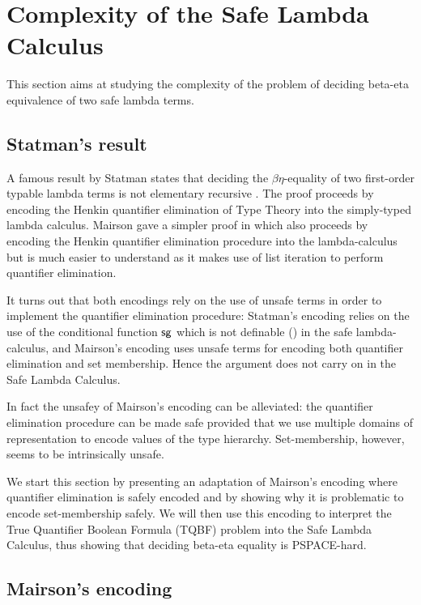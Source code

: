 \newcommand\bigo{\mathcal{O}} %
\newcommand\booltype{\mathsf{B}}

\section{Complexity of the Safe Lambda Calculus}
This section aims at studying the complexity of the problem of deciding beta-eta equivalence of two safe lambda terms.

\subsection{Statman's result}

A famous result by Statman  states that deciding the $\beta\eta$-equality of two first-order typable lambda terms is not elementary recursive \cite{Statman:1979:TLE}.
The proof proceeds by encoding the Henkin quantifier elimination of Type Theory into the simply-typed lambda calculus.
Mairson gave a simpler proof in \cite{mairson1992spt} which also proceeds by encoding the Henkin quantifier elimination procedure into the lambda-calculus but is much easier to understand as it makes use of list iteration to perform quantifier elimination.

It turns out that both encodings rely on the use of unsafe terms in order to implement the quantifier elimination procedure: Statman's encoding relies on the use of the conditional
function $\sf sg$ which is not definable (\cite{blumong:safelambdacalculus}) in the safe lambda-calculus, and Mairson's encoding uses unsafe terms for encoding both quantifier elimination and set membership. Hence the argument does not carry on in the Safe Lambda Calculus.

In fact the unsafey of Mairson's encoding can be alleviated: the quantifier elimination procedure can be made safe provided that we use multiple domains of representation to encode values of the type hierarchy. Set-membership, however, seems to be intrinsically unsafe.

We start this section by presenting an adaptation of Mairson's encoding where quantifier elimination is safely encoded and by showing why it is problematic to encode set-membership safely. We will then use this encoding to interpret the True Quantifier Boolean Formula (TQBF) problem into the Safe Lambda Calculus, thus showing that deciding beta-eta equality is PSPACE-hard.


\subsection{Mairson's encoding}

